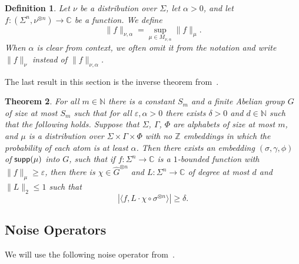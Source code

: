 \documentclass[11pt]{article}
\newtheorem{thm}{Theorem}[section]
\newtheorem{definition}[thm]{Definition}
\newcommand\card[1]{\left| {#1} \right|}
\newcommand\norm[1]{\| #1 \|}
\newcommand\inner[2]{\langle{#1},{#2}\rangle}
\newcommand\eps{\varepsilon}
\renewcommand\geq{\geqslant}
\renewcommand\leq{\leqslant}
\begin{document}
    
    \begin{definition}\label{def:semi_norm_nu}
		Let $\nu$ be a distribution over $\Sigma$, let $\alpha>0$, and let $f\colon (\Sigma^n,\nu^{\otimes n})\to\mathbb{C}$ be a function. We define
		\[
		\norm{f}_{\nu,\alpha}
		=\sup_{\mu\in M_{\nu,\alpha}}\norm{f}_{\mu}.
		\]
        When $\alpha$ is clear from context, we often omit it from the notation and write $\norm{f}_{\nu}$ instead of $\norm{f}_{\nu,\alpha}$.
	\end{definition}
    The last result in this section is the inverse theorem from~\cite{BKM4}.
    \begin{thm}\label{thm:csp4}
		For all $m\in\mathbb{N}$ there is a constant $S_m$ and
        a finite Abelian group $G$ of size at most $S_m$ such that for all
		$\eps,\alpha>0$ there exists $\delta>0$ and $d\in\mathbb{N}$ such that the following holds.
		Suppose that $\Sigma$, $\Gamma$, $\Phi$ are alphabets of size at most $m$,
		and $\mu$ is a distribution over $\Sigma\times\Gamma\times \Phi$ with no $\mathbb{Z}$ embeddings
		in which the probability of each atom is at least $\alpha$.
        Then there exists an embedding $(\sigma,\gamma,\phi)$ of ${\sf supp}(\mu)$ into $G$, such that
		if $f\colon \Sigma^n\to\mathbb{C}$ is a $1$-bounded function with $\norm{f}_{\mu}\geq \eps$, then
		there is $\chi\in \hat{G}^{\otimes n}$ and $L\colon \Sigma^n\to\mathbb{C}$ of degree at most
		$d$ and $\norm{L}_2\leq 1$ such that
		\[
		\card{\inner{f}{L\cdot \chi\circ\sigma^{\otimes n}}}\geq \delta.
		\]
	\end{thm}

    \subsection{Noise Operators}
    We will use the following noise operator from~\cite{BKM5}.
    
\end{document}
